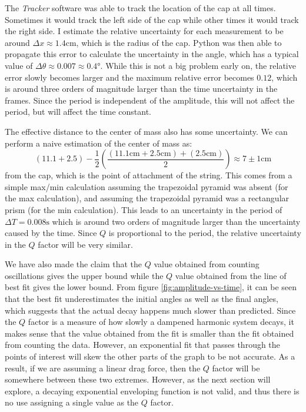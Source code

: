 \documentclass[%
 reprint,
 amsmath,amssymb
 aps,
]{revtex4-2}
\begin{document}
The \textit{Tracker} software was able to track the location of the cap at all times. Sometimes it would track the left side of the cap while other times it would track the right side. I estimate the relative uncertainty for each measurement to be around $\Delta x \approx 1.4\si{\centi\meter}$, which is the radius of the cap. Python was then able to propagate this error to calculate the uncertainty in the angle, which has a typical value of $\Delta \theta \approx 0.007 \approx 0.4\si{\degree}$. While this is not a big problem early on, the relative error slowly becomes larger and the maximum relative error becomes $0.12$, which is around three orders of magnitude larger than the time uncertainty in the frames. Since the period is independent of the amplitude, this will not affect the period, but will affect the time constant.

The effective distance to the center of mass also has some uncertainty. We can perform a naive estimation of the center of mass as:
\begin{equation}
    (11.1+2.5) - \frac{1}{2}\left(\frac{(11.1\si{\centi\meter} + 2.5 \si{\centi\meter})+(2.5\si{\centi\meter})}{2}\right) \approx 7 \pm 1\si{\centi\meter}
    \label{eq:}
\end{equation}
from the cap, which is the point of attachment of the string. This comes from a simple max/min calculation assuming the trapezoidal pyramid was absent (for the max calculation), and assuming the trapezoidal pyramid was a rectangular prism (for the min calculation). This leads to an uncertainty in the period of $\Delta T = 0.008\si{\second}$ which is around two orders of magnitude larger than the uncertainty caused by the time. Since $Q$ is proportional to the period, the relative uncertainty in the $Q$ factor will be very similar.

We have also made the claim that the $Q$ value obtained from counting oscillations gives the upper bound while the $Q$ value obtained from the line of best fit gives the lower bound. From figure \ref{fig:amplitude-vs-time}, it can be seen that the best fit underestimates the initial angles as well as the final angles, which suggests that the actual decay happens much slower than predicted. Since the $Q$ factor is a measure of how slowly a dampened harmonic system decays, it makes sense that the value obtained from the fit is smaller than the fit obtained from counting the data. However, an exponential fit that passes through the points of interest will skew the other parts of the graph to be not accurate. As a result, if we are assuming a linear drag force, then the $Q$ factor will be somewhere between these two extremes. However, as the next section will explore, a decaying exponential enveloping function is not valid, and thus there is no use assigning a single value as the $Q$ factor.
\end{document}

